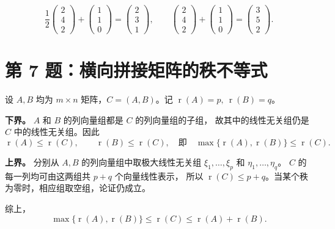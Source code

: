 \documentclass[11pt,a4paper,fontset=fandol]{ctexart}
\newcommand{\problem}[1]{\Needspace{6\baselineskip}\section*{#1}}
\newcommand{\ans}[1]{\boxed{#1}}
\newcommand{\rank}{\operatorname{r}}
\begin{document}
\[
\frac12\begin{pmatrix}2\\4\\2\end{pmatrix}
+\begin{pmatrix}1\\1\\0\end{pmatrix}
=\begin{pmatrix}2\\3\\1\end{pmatrix},\qquad
\begin{pmatrix}2\\4\\2\end{pmatrix}
+\begin{pmatrix}1\\1\\0\end{pmatrix}
=\begin{pmatrix}3\\5\\2\end{pmatrix}.
\]

\problem{第 7 题：横向拼接矩阵的秩不等式}
设 $A,B$ 均为 $m\times n$ 矩阵，$C=(A,B)$。记
$\rank(A)=p,\ \rank(B)=q$。

\textbf{下界。} $A$ 和 $B$ 的列向量组都是 $C$ 的列向量组的子组，
故其中的线性无关组仍是 $C$ 中的线性无关组。因此
\[
\rank(A)\le\rank(C),\qquad \rank(B)\le\rank(C),
\quad\text{即}\quad \max\{\rank(A),\rank(B)\}\le\rank(C).
\]

\textbf{上界。} 分别从 $A,B$ 的列向量组中取极大线性无关组
$\xi_1,\ldots,\xi_p$ 和 $\eta_1,\ldots,\eta_q$。
$C$ 的每一列均可由这两组共 $p+q$ 个向量线性表示，
所以 $\rank(C)\le p+q$。当某个秩为零时，相应组取空组，论证仍成立。

综上，
\[
\ans{\max\{\rank(A),\rank(B)\}\le\rank(C)\le\rank(A)+\rank(B).}
\]
\end{document}
